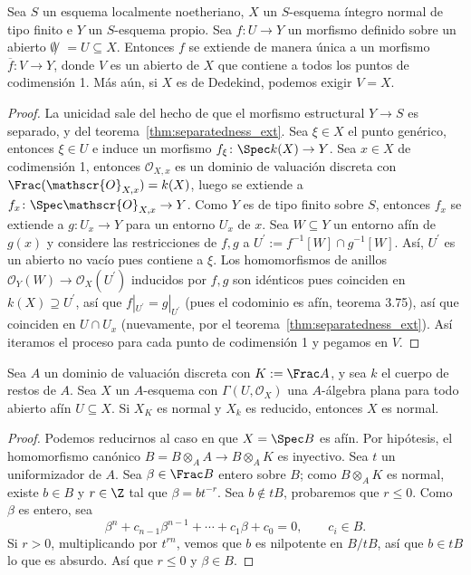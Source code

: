 \begin{prop}\label{thm:rational_map_extension}
	Sea $S$ un esquema localmente noetheriano, $X$ un $S$-esquema íntegro normal de tipo finito e $Y$ un $S$-esquema propio.
	Sea $f \colon U \to Y$ un morfismo definido sobre un abierto $\emptyset ̸= U \subseteq X$.
	Entonces $f$ se extiende de manera única a un morfismo $\overline{f}\colon V \to Y$, donde $V$ es un abierto de $X$ que
	contiene a todos los puntos de codimensión 1.
	Más aún, si $X$ es de Dedekind, podemos exigir $V = X$.
\end{prop}
\begin{proof}
	La unicidad sale del hecho de que el morfismo estructural $Y \to S$ es separado, y del teorema~\ref{thm:separatedness_ext}.
	Sea $\xi \in X$ el punto genérico,
	entonces $\xi \in U$ e induce un morfismo $f_\xi \colon \Spec k(X) \to Y$.
	Sea $x \in X$ de codimensión 1, entonces $\mathscr{O}_{X,x}$ es un dominio de valuación discreta con
	$\Frac(\mathscr{O}_{X,x}) = k(X)$, luego se extiende a $f_x \colon \Spec \mathscr{O}_{X,x} \to Y$.
	Como $Y$ es de tipo finito sobre $S$, entonces $f_x$ se extiende a $g\colon U_x \to Y$ para un entorno $U_x$
	de $x$.
	Sea $W \subseteq Y$ un entorno afín de $g(x)$ y considere las restricciones de $f, g$ a $U^\prime := f^{-1} [W ] \cap g^{-1} [W ]$.
	Así, $U^\prime$ es un abierto no vacío pues contiene a $\xi$.
	Los homomorfismos de anillos $\mathscr{O}_Y (W ) \to \mathscr{O}_X (U^\prime )$ inducidos por $f, g$ son
	idénticos pues coinciden en $k(X) \supseteq U^\prime$, así que $f|_{U^\prime} = g|_{U^\prime}$ (pues el codominio
	es afín, teorema 3.75), así que coinciden en $U \cap U_x$ (nuevamente, por el teorema~\ref{thm:separatedness_ext}).
	Así iteramos el proceso para cada punto de codimensión 1 y pegamos en $V$.
\end{proof}

\begin{lem}
	Sea $A$ un dominio de valuación discreta con $K := \Frac A$,
	y sea $k$ el cuerpo de restos de $A$. Sea $X$ un $A$-esquema con $\Gamma(U, \mathscr{O}_X)$ una
	$A$-álgebra plana para todo abierto afín $U \subseteq X$. Si $X_K$ es normal y $X_k$ es
	reducido, entonces $X$ es normal.
\end{lem}
\begin{proof}
	Podemos reducirnos al caso en que $X = \Spec B$ es afín.
	Por hipótesis, el homomorfismo canónico $B = B \otimes_A A \to B \otimes_A K$ es inyectivo.
	Sea $t$ un uniformizador de $A$. Sea $\beta \in \Frac B$ entero sobre $B$; como $B \otimes_A K$
	es normal, existe $b \in B$ y $r \in \Z$ tal que $\beta = bt^{-r}$.
	Sea $b \notin tB$, probaremos que $r \le 0$. Como $\beta$ es entero, sea
	$$ \beta^n + c_{n-1} \beta^{n-1} + \cdots + c_1 \beta + c_0 = 0, \qquad c_i \in B. $$
	Si $r > 0$, multiplicando por $t^{rn}$, vemos que $b$ es nilpotente en $B/tB$, así que
	$b \in tB$ lo que es absurdo. Así que $r \le 0$ y $\beta \in B$.
\end{proof}

